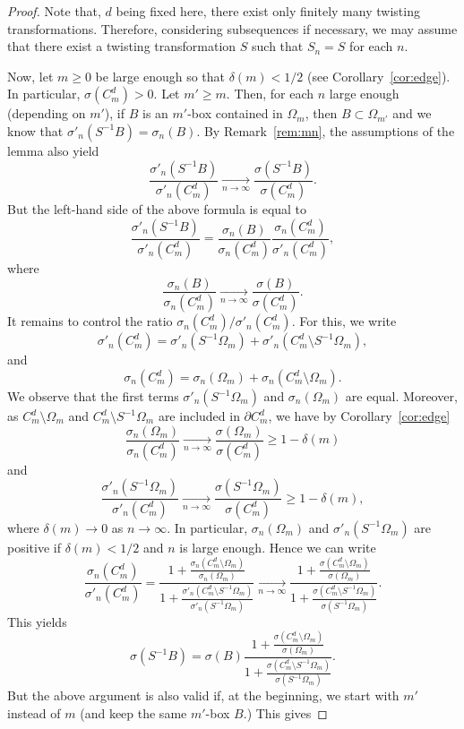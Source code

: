 \documentclass[AHL,Unicode,longabstracts]{cedram}
\newcommand{\tend}[3][]{\xrightarrow[#2\to#3]{#1}}
\newcommand{\cd}{C^{d}}
\newcommand{\ovC}{\Omega}
\begin{document}
\begin{proof}
Note that, $d$ being fixed here, there exist only finitely many twisting transformations. Therefore, considering subsequences if necessary, we may assume that there exist a twisting transformation $S$ such that $S_n=S$ for each $n$.

Now, let $m\ge0$ be large enough so that $\delta(m)<1/2$ (see Corollary~\ref{cor:edge}). In particular, $\sigma(\cd_m)>0$. Let $m'\ge m$. Then, for each $n$ large enough (depending on $m'$), if $B$ is an $m'$-box contained in $\ovC_m$, then $B\subset\ovC_{m'}$ and we know that $\sigma'_n(S^{-1}B)=\sigma_n(B)$. By Remark~\ref{rem:mn}, the assumptions of the lemma also yield
\[
\dfrac{\sigma'_n(S^{-1}B)}{\sigma'_n(\cd_m)}\tend{n}{\infty} \dfrac{\sigma(S^{-1}B)}{\sigma(\cd_m)}.
\]
But the left-hand side of the above formula is equal to
\[
\dfrac{\sigma'_n(S^{-1}B)}{\sigma'_n(\cd_m)}=\dfrac{\sigma_n(B)}{\sigma_n(\cd_m)} \dfrac{\sigma_n(\cd_m)}{\sigma'_n(\cd_m)},
\]
where
\[
\dfrac{\sigma_n(B)}{\sigma_n(\cd_m)}\tend{n}{\infty} \dfrac{\sigma(B)}{\sigma(\cd_m)}.
\]
It remains to control the ratio $\sigma_n(\cd_m)/{\sigma'_n(\cd_m)}$. For this, we write
\[
\sigma'_n(\cd_m)=\sigma'_n(S^{-1}\ovC_m)+\sigma'_n(\cd_m\setminus S^{-1}\ovC_m),
\]
and
\[
\sigma_n(\cd_m)=\sigma_n(\ovC_m)+\sigma_n(\cd_m\setminus \ovC_m).
\]
We observe that the first terms $\sigma'_n(S^{-1}\ovC_m)$ and $\sigma_n(\ovC_m)$ are equal. Moreover, as $\cd_m\setminus \ovC_m$ and $\cd_m\setminus S^{-1}\ovC_m$ are included in $\partial \cd_m$, we have by Corollary~\ref{cor:edge}
\[
\frac{\sigma_n(\ovC_m)}{\sigma_n(\cd_m)}\tend{n}{\infty} \frac{\sigma(\ovC_m)}{\sigma(\cd_m)} \ge 1-\delta(m)
\]
and
\[
\frac{\sigma'_n(S^{-1}\ovC_m)}{\sigma'_n(\cd_m)}\tend{n}{\infty} \frac{\sigma(S^{-1}\ovC_m)}{\sigma(\cd_m)} \ge 1-\delta(m),
\]
where $\delta(m)\to 0$ as $n\to \infty$. In particular, $\sigma_n(\ovC_m)$ and $\sigma'_n(S^{-1}\ovC_m)$ are positive if $\delta(m)<1/2$ and $n$ is large enough. Hence we can write
\[
\dfrac{\sigma_n(\cd_m)}{\sigma'_n(\cd_m)} = \dfrac{1+ \frac{\sigma_n(\cd_m\setminus \ovC_m)}{\sigma_n(\ovC_m)} }{1+ \frac{\sigma'_n(\cd_m\setminus S^{-1}\ovC_m)}{\sigma'_n(S^{-1}\ovC_m)} }
\tend{n}{\infty} \dfrac{1+ \frac{\sigma(\cd_m\setminus \ovC_m)}{\sigma(\ovC_m)} }{1+ \frac{\sigma(\cd_m\setminus S^{-1}\ovC_m)}{\sigma(S^{-1}\ovC_m)} }.
\]
This yields
\[
\sigma(S^{-1}B)={\sigma(B)}
\dfrac{1+ \frac{\sigma(\cd_m\setminus \ovC_m)}{\sigma(\ovC_m)} }{1+ \frac{\sigma(\cd_m\setminus S^{-1}\ovC_m)}{\sigma(S^{-1}\ovC_m)} }.
\]
But the above argument is also valid if, at the beginning, we start with $m'$ instead of $m$ (and keep the same $m'$-box $B$.) This gives

\end{proof}
\end{document}
